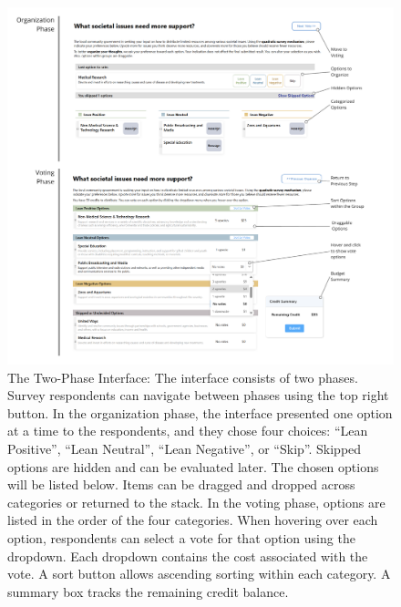 \begin{figure}[ht]
    \centering
    \includegraphics[width=1\textwidth]{content/image/detailed.pdf}
    \caption{The Two-Phase Interface: The interface consists of two phases. Survey respondents can navigate between phases using the top right button. In the organization phase, the interface presented one option at a time to the respondents, and they chose four choices: ``Lean Positive'', ``Lean Neutral'', ``Lean Negative'', or ``Skip''. Skipped options are hidden and can be evaluated later. The chosen options will be listed below. Items can be dragged and dropped across categories or returned to the stack. In the voting phase, options are listed in the order of the four categories. When hovering over each option, respondents can select a vote for that option using the dropdown. Each dropdown contains the cost associated with the vote. A sort button allows ascending sorting within each category. A summary box tracks the remaining credit balance.}
    \label{fig:interactiveInterface}
    \Description{
}
\end{figure}

